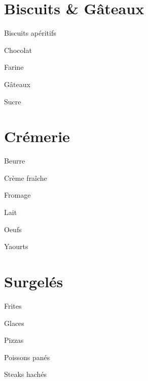 \documentclass[8pt,landscape,a4paper]{article}
\begin{document}
\begin{multicols*}{4}
    \section{Biscuits \& Gâteaux}
    \begin{todolist}
    \item Biscuits apéritifs
    \item Chocolat
    \item Farine
    \item Gâteaux
    \item Sucre
    \item 
    \item 
    \item 
    \item 
    \end{todolist}

    \section{Crémerie}
    \begin{todolist}
    \item Beurre
    \item Crème fraîche
    \item Fromage
    \item Lait
    \item Oeufs
    \item Yaourts
    \item 
    \item 
    \item 
    \item 
    \item
    \end{todolist}

    \section{Surgelés}
    \begin{todolist}
    \item Frites
    \item Glaces
    \item Pizzas
    \item Poissons panés
    \item Steaks hachés
    \item 
    \item 
    \item 
    \item 
    \item
    \item
    \end{todolist}



\end{multicols*}
\end{document}
